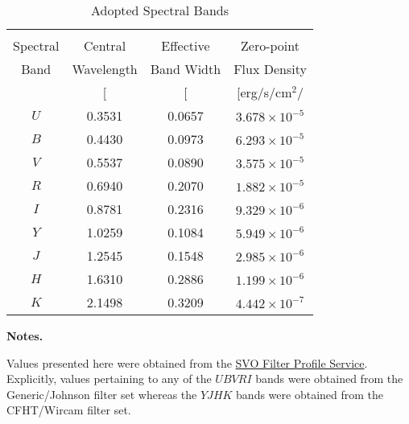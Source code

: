 \begin{table*}
  \small
  \renewcommand{\arraystretch}{0.7}
  \caption{Adopted Spectral Bands}
  \label{RVFCtable:bands}
  \begin{tabular}{cccc}
    \hline \\ [-1ex]
    Spectral & Central & Effective & Zero-point \\ Band & Wavelength & Band Width & Flux Density \\ & [\micron{]} &  [\micron{]} & [erg/s/cm$^2$/\micron{]} \\
    \hline
    $U$ & 0.3531 & 0.0657 & $3.678 \times 10^{-5}$ \\
    $B$ & 0.4430 & 0.0973 & $6.293 \times 10^{-5}$ \\  
    $V$ & 0.5537 & 0.0890 & $3.575 \times 10^{-5}$ \\
    $R$ & 0.6940 & 0.2070 & $1.882 \times 10^{-5}$ \\
    $I$ & 0.8781 & 0.2316 & $9.329 \times 10^{-6}$ \\
    $Y$ & 1.0259 & 0.1084 & $5.949 \times 10^{-6}$ \\
    $J$ & 1.2545 & 0.1548 & $2.985 \times 10^{-6}$ \\
    $H$ & 1.6310 & 0.2886 & $1.199 \times 10^{-6}$ \\
    $K$ & 2.1498 & 0.3209 & $4.442 \times 10^{-7}$
  \end{tabular}
  \begin{list}{}{}
  \item {\bf{Notes.}}
  \item Values presented here were obtained from the \href{http://svo2.cab.inta-csic.es/theory/fps3/index.php?mode=browse}{SVO Filter Profile Service}. Explicitly, values pertaining to any of the $UBVRI$ bands were obtained from the Generic/Johnson filter set whereas the $YJHK$ bands were obtained from the CFHT/Wircam filter set.
  \end{list}
\end{table*}
